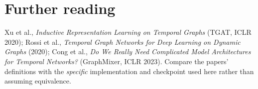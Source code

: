 \documentclass[11pt]{article}
\begin{document}
\section{Further reading}
Xu et al., \emph{Inductive Representation Learning on Temporal Graphs} (TGAT, ICLR 2020); Rossi et al., \emph{Temporal Graph Networks for Deep Learning on Dynamic Graphs} (2020); Cong et al., \emph{Do We Really Need Complicated Model Architectures for Temporal Networks?} (GraphMixer, ICLR 2023). Compare the papers' definitions with the \emph{specific} implementation and checkpoint used here rather than assuming equivalence.
\end{document}

